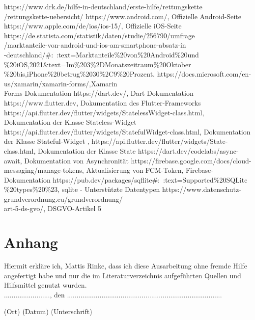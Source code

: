 \documentclass[12pt]{article}
\begin{document}
\begin{thebibliography}{9}
    https://www.drk.de/hilfe-in-deutschland/erste-hilfe/rettungskette\\
    /rettungskette-uebersicht/
    https://www.android.com/, Offizielle Android-Seite
    https://www.apple.com/de/ios/ios-15/, Offizielle iOS-Seite
    https://de.statista.com/statistik/daten/studie/256790/umfrage\\
    /marktanteile-von-android-und-ios-am-smartphone-absatz-in\\
    -deutschland/\#:~:text=Marktanteile\%20von\%20Android\%20und\\
    \%20iOS,2021\&text=Im\%203\%2DMonatszeitraum\%20Oktober\\
    \%20bis,iPhone\%20betrug\%2030\%2C9\%20Prozent.
    https://docs.microsoft.com/en-us/xamarin/xamarin-forms/,Xamarin \\
    Forms Dokumentation
    https://dart.dev/, Dart Dokumentation
    https://www.flutter.dev, Dokumentation des Flutter-Frameworks
    https://api.flutter.dev/flutter/widgets/StatelessWidget-class.html,
    \\ Dokumentation der Klasse Stateless-Widget
    https://api.flutter.dev/flutter/widgets/StatefulWidget-class.html, 
    Dokumentation der Klasse Stateful-Widget
    , https://api.flutter.dev/flutter/widgets/State-class.html, Dokumentation der 
    Klasse State
    https://dart.dev/codelabs/async-await, Dokumentation von Asynchronität
    https://firebase.google.com/docs/cloud-messaging/manage-tokens, 
    Aktualisierung von FCM-Token, Firebase-Dokumentation
    https://pub.dev/packages/sqflite\#:~:text=Supported\%20SQLite\\
    \%20types\%20\%23, sqlite - Unterstützte Datentypen
    https://www.datenschutz-grundverordnung.eu/grundverordnung/\\
    art-5-ds-gvo/, DSGVO-Artikel 5
\end{thebibliography}

\newpage
\section{Anhang}

Hiermit erkläre ich, Mattis Rinke, dass ich diese Ausarbeitung ohne fremde Hilfe
angefertigt habe und nur die im Literaturverzeichnis aufgeführten
Quellen und Hilfsmittel genutzt wurden.\\

    ........................, den .................................................................................

\quad\quad  (Ort)    \hfil           (Datum)                   \hfil  (Unterschrift)
\end{document}
